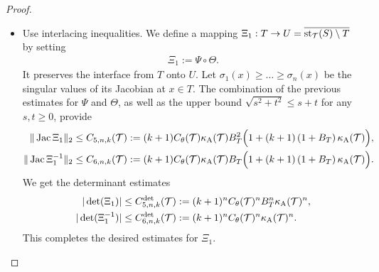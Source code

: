 \documentclass[10pt,a4paper]{article}
\newcommand{\mwl}[1]{{\color{red}#1}}
\begin{document}
\begin{proof}
\begin{itemize}
        
        \item 
		\mwl{Use interlacing inequalities.}
        We define a mapping $ \Xi_{1} : T \rightarrow U = \overline{\operatorname{st}_{{\mathcal T}}(S) \setminus T}$ by setting 
        \begin{align*}
            \Xi_{1} := \Psi \circ \Theta.
        \end{align*}
        It preserves the interface from $T$ onto $U$. 
		Let $\sigma_1(x) \geq \dots \geq \sigma_n(x)$ be the singular values of its Jacobian at $x \in T$. 
        The combination of the previous estimates for $\Psi$ and $\Theta$,
        as well as the upper bound $\sqrt{s^2+t^2} \leq s + t$ for any $s,t \geq 0$,
        provide 
        \begin{align*}
            \|  \operatorname{{\rm Jac}} \Xi_{1}  \|_{2}
            &\leq 
            C_{5,n,k}({\mathcal T})
            :=
            (k+1) 
            C_\theta({\mathcal T})
            \kappa_{\rm A}({\mathcal T})
            B_{T}^{2}
            \Big( 
                1 
                + 
                (k+1) 
                \left( 1 + B_{T} \right)
                \kappa_{\rm A}({\mathcal T})
            \Big)            
            ,
            \\
            \|  \operatorname{{\rm Jac}} \Xi_{1}^{-1}  \|_{2}
            &\leq  
            C_{6,n,k}({\mathcal T})
            :=
            (k+1) 
            C_\theta({\mathcal T})
            \kappa_{\rm A}({\mathcal T})
            B_{T}
            \Big( 
                1 
                + 
                (k+1) 
                \left( 1 + B_{T} \right)
                \kappa_{\rm A}({\mathcal T})
            \Big)            
            .
        \end{align*}
        We get the determinant estimates
        \begin{align*}
            |\det(\Xi_{1})|
            &\leq 
            C^{\det}_{5,n,k}({\mathcal T})
            :=
            (k+1)^{n}
            C_\theta({\mathcal T})^{n}
            B_{T}^{n}
            \kappa_{\rm A}({\mathcal T})^{n}
            ,
            \\
            |\det(\Xi_{1}^{-1})|
            &\leq 
            C^{\det}_{6,n,k}({\mathcal T})
            :=
            (k+1)^{n}
            C_\theta({\mathcal T})^{n}
            \kappa_{\rm A}({\mathcal T})^{n}
            .
        \end{align*}
        This completes the desired estimates for $\Xi_{1}$. 
        

\end{itemize}
\end{proof}
\end{document}

